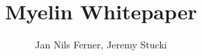 \documentclass[a4paper]{article}
\title{Myelin Whitepaper}
\author{Jan Nils Ferner, Jeremy Stucki}
\begin{document}
\maketitle
\thispagestyle{empty}

\clearpage

\twocolumn

\begin{abstract}
    
\end{abstract}

\clearpage

\onecolumn
\tableofcontents
\twocolumn

\clearpage







\clearpage

\nocite{*}


\end{document}
